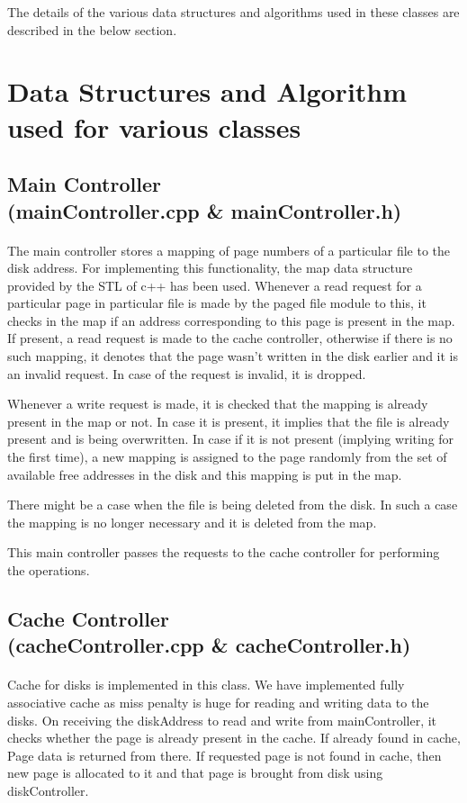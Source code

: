 \documentclass[11pt]{article}
\begin{document}
The details of the various data structures and algorithms used in these classes are described in the below section.

\section{Data Structures and Algorithm used for various classes}

\subsection{Main Controller \\ (mainController.cpp \& mainController.h)}
\paragraph{}
The main controller stores a mapping of page numbers of a particular file to the disk address. For implementing this functionality, the map data structure provided by the STL of c++ has been used. Whenever a read request for a particular page in particular file is made by the paged file module to this, it checks in the map if an address corresponding to this page is present in the map. If present, a read request is made to the cache controller, otherwise if there is no such mapping, it denotes that the page wasn't written in the disk earlier and it is an invalid request. In case of the request is invalid, it is dropped.

Whenever a write request is made, it is checked that the mapping is already present in the map or not. In case it is present, it implies that the file is already present and is being overwritten. In case if it is not present (implying writing for the first time), a new mapping is assigned to the page randomly from the set of available free addresses in the disk and this mapping is put in the map.

There might be a case when the file is being deleted from the disk. In such a case the mapping is no longer necessary and it is deleted from the map.

This main controller passes the requests to the cache controller for performing the operations.

\subsection{Cache Controller \\ (cacheController.cpp \& cacheController.h)}
\paragraph{}
Cache for disks is implemented in this class. We have implemented fully associative cache as miss penalty is huge for reading and writing data to the disks. On receiving the diskAddress to read and write from mainController, it checks whether the page is already present in the cache. If already found in cache, Page data is returned from there. If requested page is not found in cache, then new page is allocated to it and that page is brought from disk using diskController.
\end{document}
